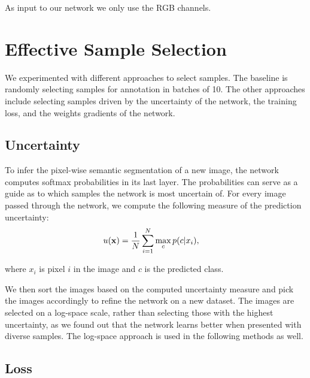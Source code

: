 \documentclass[letterpaper, 10 pt, conference]{ieeeconf}  %
\begin{document}
As input to our network we only use the RGB channels.


%
%
%
%
%
%


\section{Effective Sample Selection}

We experimented with different approaches to select samples. The baseline is randomly selecting samples for annotation in batches of 10. The other approaches include selecting samples driven by the uncertainty of the network, the training loss, and the weights gradients of the network.   


\subsection{Uncertainty}

To infer the pixel-wise semantic segmentation of a new image, the network computes softmax probabilities in its last layer. The probabilities can serve as a guide as to which samples the network is most uncertain of. For every image passed through the network, we compute the following measure of the prediction uncertainty:
\begin{align}
u(\bold{x}) &= \frac{1}{N} \sum_{i=1}^N \max_c p(c|x_i),
\end{align}  

where $x_i$ is pixel $i$ in the image and $c$ is the predicted class.

We then sort the images based on the computed uncertainty measure and pick the images accordingly to refine the network on a new dataset. The images are selected on a log-space scale, rather than selecting those with the highest uncertainty, as we found out that the network learns better when presented with diverse samples. The log-space approach is used in the following methods as well.

\subsection{Loss} \label{sec:loss}
\end{document}

